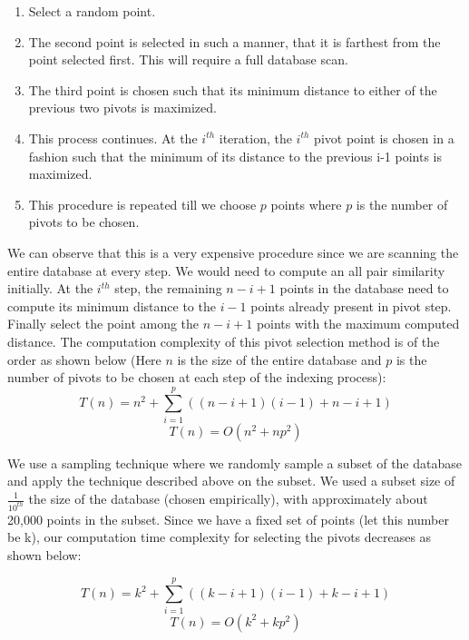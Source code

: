 \begin{enumerate}
	\item Select a random point.
	\item The second point is selected in such a manner, that it is farthest from the point selected first. This will require a full database scan.
	\item The third point is chosen such that its minimum distance to either of the previous two pivots is maximized.
	\item This process continues. At the $i^{th}$ iteration, the $i^{th}$ pivot point is chosen in a fashion such that the minimum of its distance to the previous i-1 points is maximized.
	\item This procedure is repeated till we choose $p$ points where $p$ is the number of pivots to be chosen.\\

\end{enumerate} 

We can observe that this is a very expensive procedure since we are scanning the entire database at every step. We would need to compute an all pair similarity initially. At the $i^{th}$ step, the remaining $n-i+1$ points in the database need to compute its minimum distance to the $i-1$ points already present in pivot step. Finally select the point among the $n-i+1$ points with the maximum computed distance. The computation complexity of this pivot selection method is of the order as shown below (Here $n$ is the size of the entire database and $p$ is the number of pivots to be chosen at each step of the indexing process):\\
	\begin{equation}
	T(n)=  n^2 + \sum \limits_{i=1}^{p}( (n-i+1)(i-1)  + n-i+1) 
	\end{equation}
	\begin{equation}
	T(n)=O(n^2 + np^2)
	\end{equation}

We use a sampling technique where we randomly sample a subset of the database and apply the technique described above on the subset. We used a subset size of $\frac{1}{10^{th}}$ the size of the database (chosen empirically), with approximately about 20,000 points in the subset. Since we have a fixed set of points (let this number be k), our computation time complexity for selecting the pivots decreases as shown below: 

	\begin{equation}
	T(n)=  k^2 + \sum \limits_{i=1}^{p}( (k-i+1)(i-1)  + k-i+1) 
	\end{equation}
	\begin{equation}
	T(n)=O(k^2 + kp^2)
	\end{equation}



